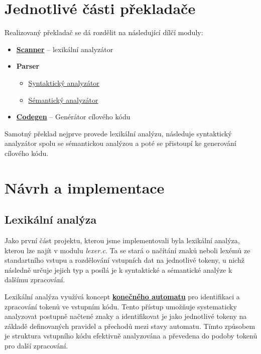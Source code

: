 \documentclass[a4paper, 12pt]{article} %
\begin{document}
    \section{Jednotlivé části překladače}
    Realizovaný překladač se dá rozdělit na následující dílčí moduly:
    \begin{itemize}[noitemsep]
        \item \hyperref[lexer]{\textbf{Scanner}} -- lexikální analyzátor
        \item \textbf{Parser}
            \begin{itemize}
                \item \hyperref[syntactics]{Syntaktický analyzátor}
                \item \hyperref[semantics]{Sémantický analyzátor}
            \end{itemize}
        \item \hyperref[codegen]{\textbf{Codegen}} -- Genérátor cílového kódu
    \end{itemize}
    Samotný překlad nejprve provede lexikální analýzu, následuje syntaktický 
    analyzátor spolu se sémantickou analýzou a poté se přistoupí ke generování 
    cílového kódu. 

    \section{Návrh a implementace}\label{lexer}
        \subsection{Lexikální analýza}
            Jako první část projektu, kterou jsme implementovali byla lexikální analýza, kterou
            lze najít v modulu \textit{lexer.c}. Ta se
            stará o načítání znaků neboli lexémů ze standartního vstupu a rozdělování vstupních dat na 
            jednotlivé tokeny, u nichž následně určuje jejich typ a posílá 
            je k syntaktické a sémantické analýze k 
            dalšímu zpracování. 

            Lexikální analýza využívá koncept \hyperref[kodiagram]{\textbf{konečného automatu}} pro 
            identifikaci a zpracování tokenů ve vstupním kódu. Tento přístup umožňuje systematicky 
            analyzovat postupně načtené znaky a identifikovat je jako jednotlivé tokeny na základě 
            definovaných pravidel a přechodů mezi stavy automatu. Tímto způsobem je struktura 
            vstupního kódu efektivně analyzována a převedena do podoby tokenů pro další zpracování. 
\end{document}
